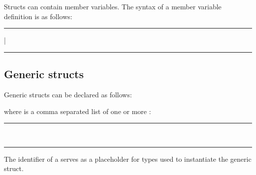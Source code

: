 Structs can contain member variables. The syntax of a member variable definition
is as follows:

\begin{grammar}
\rule{let-or-var}  | \\
\rule{member-variable-declaration}   \code{:}  \code{;}
\end{grammar}

\subsection{Generic structs}

Generic structs can be declared as follows:

\begin{grammar}
  \code{<}  \code{>} \code{\{}  \code{\}}
\end{grammar}

where  is a comma separated list of one or
more :

\begin{grammar}
\rule{generic-parameter} \\
\rule{generic-type-parameter} 
\end{grammar}

The identifier of a  serves as a placeholder
for types used to instantiate the generic struct.

